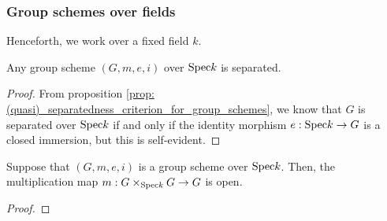         \subsubsection{Group schemes over fields}
            \begin{convention}
                Henceforth, we work over a fixed field $k$.
            \end{convention}
            
            \begin{proposition} \label{prop: group_schemes_over_fields_are_separated}
                Any group scheme $(G, m, e, i)$ over $\mathrm{Spec} k$ is separated. 
            \end{proposition}
                \begin{proof}
                    From proposition \ref{prop: (quasi)_separatedness_criterion_for_group_schemes}, we know that $G$ is separated over $\mathrm{Spec} k$ if and only if the identity morphism $e: \mathrm{Spec} k \to G$ is a closed immersion, but this is self-evident.
                \end{proof}
            
            \begin{proposition} \label{prop: multiplication_maps_of_group_schemes_over_fields_are_open}
                Suppose that $(G, m, e, i)$ is a group scheme over $\mathrm{Spec} k$. Then, the multiplication map $m: G \x_{\Spec k} G \to G$ is open.
            \end{proposition}
                \begin{proof}
                    
                \end{proof}
            
